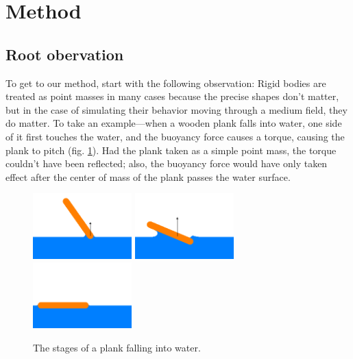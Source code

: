 \section{Method}

\subsection{Root obervation}

To get to our method, start with the following observation:
Rigid bodies are treated as point masses in many cases because the precise shapes don't matter, but in the case of simulating their behavior moving through a medium field, they do matter.
To take an example---when a wooden plank falls into water, one side of it first touches the water, and the buoyancy force causes a torque, causing the plank to pitch (fig. \ref{fig:plank-falling-into-water-illustration}).
Had the plank taken as a simple point mass, the torque couldn't have been reflected;
also, the buoyancy force would have only taken effect after the center of mass of the plank passes the water surface.

\begin{figure}[h]
	\def\ih{1in}
	\centering
	\includegraphics[height=\ih]{../Thesis/figures/stages-of-a-plank-falling-into-water/1.png}
	\includegraphics[height=\ih]{../Thesis/figures/stages-of-a-plank-falling-into-water/2.png}
	\includegraphics[height=\ih]{../Thesis/figures/stages-of-a-plank-falling-into-water/3.png}
	\caption{The stages of a plank falling into water.}
	\label{fig:plank-falling-into-water-illustration}
\end{figure}

